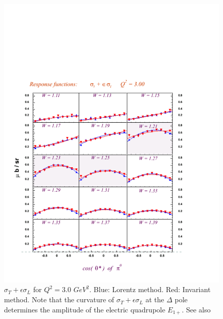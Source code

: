 \begin{figure}[h]
 \begin{center}
  \includegraphics[width = 12cm, bb = 40 20 580 580]{systematics/img/lpt_Q23.00_mm0.080_ct0.95_L1}
  \caption{$\sigma_T + \epsilon\sigma_L$ for $Q^2=3.0$ $GeV^2$. Blue: Lorentz method. Red: Invariant method.
           Note that the curvature of $\sigma_T + 
           \epsilon\sigma_L$ at the $\Delta$ pole determines the amplitude of the electric 
            quadrupole $E_{1+}$. See also }
  \label{fig:cmthetalpt}
 \end{center}
\end{figure} 
